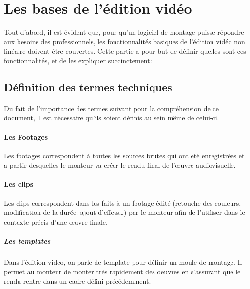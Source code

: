 \newpage

\section{Les bases de l'édition vidéo}

\paragraph{}

Tout d'abord, il est évident que, pour qu'un logiciel de montage
puisse répondre aux besoins des professionnels, les fonctionnalités
basiques de l'édition vidéo non linéaire doivent être couvertes.
Cette partie a pour but de définir quelles sont ces fonctionnalités,
et de les expliquer succinctement:

\subsection{Définition des termes techniques}

\paragraph {}

Du fait de l'importance des termes suivant pour la compréhension de
ce document, il est nécessaire qu'ils soient définis au sein même
de celui-ci.

\paragraph{Les Footages}

Les footages correspondent à toutes les sources brutes qui ont été
enregistrées et a partir desquelles le monteur va créer le rendu final
de l'œuvre audiovisuelle.

\paragraph{Les clips}

Les clips correspondent dans les faits à un footage édité (retouche
des couleurs, modification de la durée, ajout d'effets\ldots) par le
monteur afin de l'utiliser dans le contexte précis d'une œuvre finale.

\subparagraph{Les templates}

Dans l'édition video, on parle de template pour définir un moule de
montage.  Il permet au monteur de monter très rapidement des oeuvres
en s'assurant que le rendu rentre dans un cadre défini précédemment.

